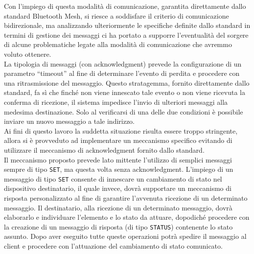 \noindent Con l'impiego di questa modalità di comunicazione, garantita direttamente dallo standard Bluetooth Mesh, si riesce a soddisfare il criterio di comunicazione bidirezionale, ma analizzando ulteriormente le specifiche definite dallo standard in termini di gestione dei messaggi ci ha portato a supporre l'eventualità del sorgere di alcune problematiche legate alla modalità di comunicazione che avremmo voluto ottenere. \\ %
La tipologia di messaggi (con acknowledgment) prevede la configurazione di un parametro ``timeout'' al fine di determinare l'evento di perdita e procedere con una ritrasmissione del messaggio. Questo stratagemma, fornito direttamente dallo standard, fa sì che finché non viene innescato tale evento o non viene ricevuta la conferma di ricezione, il sistema impedisce l'invio di ulteriori messaggi alla medesima destinazione. Solo al verificarsi di una delle due condizioni è possibile inviare un nuovo messaggio a tale indirizzo. \\
Ai fini di questo lavoro la suddetta situazione risulta essere troppo stringente, allora si è provveduto ad implementare un meccanismo specifico evitando di utilizzare il meccanismo di acknowledgment fornito dallo standard.\\ 
Il meccanismo proposto prevede lato mittente l'utilizzo di semplici messaggi sempre di tipo \texttt{SET}, ma questa volta senza acknowledgment. L'impiego di un messaggio di tipo \texttt{SET} consente di innescare un cambiamento di stato nel dispositivo destinatario, il quale invece, dovrà supportare un meccanismo di risposta personalizzato al fine di garantire l'avvenuta ricezione di un determinato messaggio. Il destinatario, alla ricezione di un determinato messaggio, dovrà elaborarlo e individuare l'elemento e lo stato da attuare, dopodiché procedere con la creazione di un messaggio di risposta (di tipo \texttt{STATUS}) contenente lo stato assunto. Dopo aver eseguito tutte queste operazioni potrà spedire il messaggio al client e procedere con l'attuazione del cambiamento di stato comunicato.\\ %

